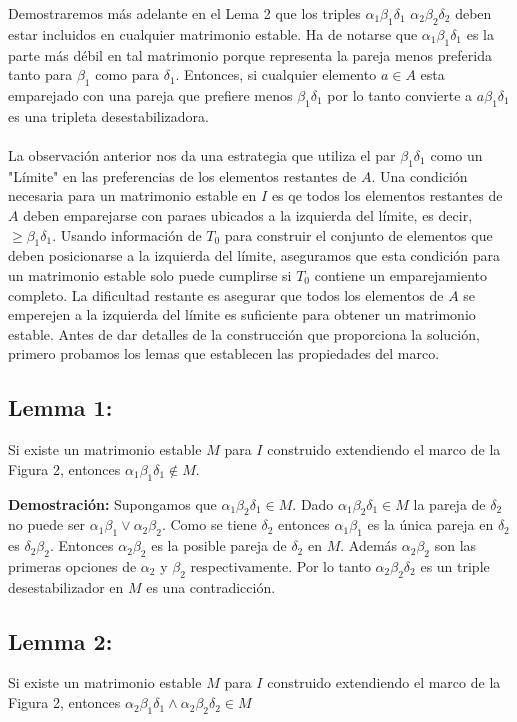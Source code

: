 \documentclass{article}
\begin{document}
Demostraremos más adelante en el Lema 2 que los triples $\alpha_1 \beta_1 \delta_1$  $\alpha_2 \beta_2 \delta_2$
deben estar incluidos en cualquier matrimonio estable. Ha de notarse que $\alpha_1 \beta_1 \delta_1$ es la parte más débil en tal matrimonio
porque representa la pareja menos preferida tanto para $\beta_1$ como para $\delta_1$. Entonces, si cualquier elemento $a \in A$ esta emparejado con una pareja
que prefiere menos $\beta_1 \delta_1$ por lo tanto convierte a $a\beta_1\delta_1$ es una tripleta desestabilizadora.
\\
\\
La observación anterior nos da una estrategia que utiliza el par $\beta_1 \delta_1$ como un "Límite" en las preferencias de los elementos restantes de $A$.
Una condición necesaria para un matrimonio estable en $I$ es qe todos los elementos restantes de $A$ deben emparejarse con paraes ubicados a la izquierda del límite, es decir, $\geq \beta_1 \delta_1$. Usando información de $T_0$ para construir el conjunto de elementos que deben posicionarse 
a la izquierda del límite, aseguramos que esta condición para un matrimonio estable solo puede cumplirse si $T_0$ contiene un emparejamiento completo.
La dificultad restante es asegurar que todos los elementos de $A$ se emperejen a la izquierda del límite es suficiente para obtener un matrimonio estable. Antes de dar detalles de la construcción que proporciona la solución, primero probamos los lemas que establecen las propiedades del marco.

\subsection{Lemma 1:}
Si existe un matrimonio estable $M$ para $I$ construido extendiendo el marco de la Figura 2, entonces $\alpha_1 \beta_1 \delta_1 \notin M $.

\textbf{Demostración: }Supongamos que $\alpha_1 \beta_2 \delta_1 \in M$. Dado $\alpha_1 \beta_2 \delta_1 \in M$ la pareja de $\delta_2$ no puede ser $\alpha_1 \beta_1 \lor  \alpha_2 \beta_2$.
Como se tiene $\delta_2$ entonces $\alpha_1 \beta_1$ es la única pareja en $\delta_2$ es $\delta_2 \beta_2$.
Entonces $\alpha_2 \beta_2$ es la posible pareja de $\delta_2$ en $M$. Además $\alpha_2 \beta_2$ son las primeras opciones de $\alpha_2$ y $\beta_2$ respectivamente. Por lo tanto $\alpha_2 \beta_2 \delta_2$ es un triple desestabilizador en $M$ es una contradicción.

\subsection{Lemma 2:}
Si existe un matrimonio estable $M$ para $I$ construido extendiendo el marco de la Figura 2, entonces $\alpha_2 \beta_1 \delta_1 \land \alpha_2 \beta_2 \delta_2  \in M$ 
\end{document}
